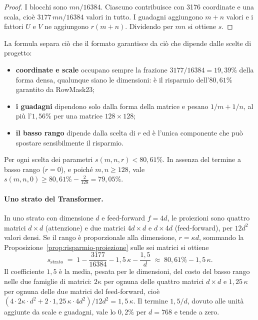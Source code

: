 \begin{proof}
I blocchi sono $mn/16384$. Ciascuno contribuisce con 3176 coordinate e una scala, cioè $3177\,mn/16384$ valori in tutto. I guadagni aggiungono $m+n$ valori e i fattori $U$ e $V$ ne aggiungono $r(m+n)$. Dividendo per $mn$ si ottiene $s$.
\end{proof}

La formula separa ciò che il formato garantisce da ciò che dipende dalle scelte di progetto:
\begin{itemize}
\item \textbf{coordinate e scale} occupano sempre la frazione $3177/16384=19{,}39\%$ della forma densa, qualunque siano le dimensioni: è il risparmio dell'$80{,}61\%$ garantito da RowMask23;
\item \textbf{i guadagni} dipendono solo dalla forma della matrice e pesano $1/m+1/n$, al più l'$1{,}56\%$ per una matrice $128\times128$;
\item \textbf{il basso rango} dipende dalla scelta di $r$ ed è l'unica componente che può spostare sensibilmente il risparmio.
\end{itemize}

\begin{osservazione}[Limiti]
Per ogni scelta dei parametri $s(m,n,r)<80{,}61\%$. In assenza del termine a basso rango ($r=0$), e poiché $m,n\ge128$, vale $s(m,n,0)\ge 80{,}61\%-\tfrac{2}{128}=79{,}05\%$.
\end{osservazione}

\paragraph{Uno strato del Transformer.} In uno strato con dimensione $d$ e feed-forward $f=4d$, le proiezioni sono quattro matrici $d\times d$ (attenzione) e due matrici $4d\times d$ e $d\times 4d$ (feed-forward), per $12d^2$ valori densi. Se il rango è proporzionale alla dimensione, $r=\kappa d$, sommando la Proposizione~\ref{prop:risparmio-proiezione} sulle sei matrici si ottiene
\[
s_{\text{strato}} \;=\; 1-\frac{3177}{16384} - 1{,}5\,\kappa - \frac{1{,}5}{d}
\;\approx\; 80{,}61\% - 1{,}5\,\kappa .
\]
Il coefficiente $1{,}5$ è la media, pesata per le dimensioni, del costo del basso rango nelle due famiglie di matrici: $2\kappa$ per ognuna delle quattro matrici $d\times d$ e $1{,}25\,\kappa$ per ognuna delle due matrici del feed-forward, cioè $(4\cdot 2\kappa\cdot d^2+2\cdot1{,}25\,\kappa\cdot4d^2)/12d^2=1{,}5\,\kappa$. Il termine $1{,}5/d$, dovuto alle unità aggiunte da scale e guadagni, vale lo $0{,}2\%$ per $d=768$ e tende a zero.

